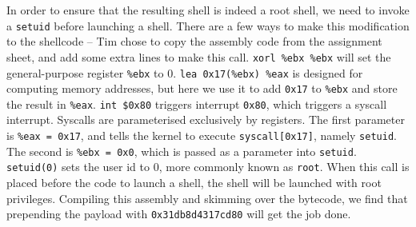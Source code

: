 In order to ensure that the resulting shell is indeed a root shell, we need to invoke a {\tt setuid} before launching a shell. There are a few ways to make this modification to the shellcode -- Tim chose to copy the assembly code from the assignment sheet, and add some extra lines to make this call. {\tt xorl \%ebx \%ebx} will set the general-purpose register {\tt \%ebx} to 0. {\tt lea 0x17(\%ebx) \%eax} is designed for computing memory addresses, but here we use it to add {\tt 0x17} to {\tt \%ebx} and store the result in {\tt \%eax}. {\tt int \$0x80} triggers interrupt {\tt 0x80}, which triggers a syscall interrupt. Syscalls are parameterised exclusively by registers.%
 The first parameter is {\tt \%eax = 0x17}, and tells the kernel to execute {\tt syscall[0x17]}, namely {\tt setuid}. The second is {\tt \%ebx = 0x0}, which is passed as a parameter into {\tt setuid}. {\tt setuid(0)} sets the user id to 0, more commonly known as {\tt root}. When this call is placed before the code to launch a shell, the shell will be launched with root privileges. Compiling this assembly and skimming over the bytecode, we find that prepending the payload with {\tt 0x31db8d4317cd80} will get the job done.